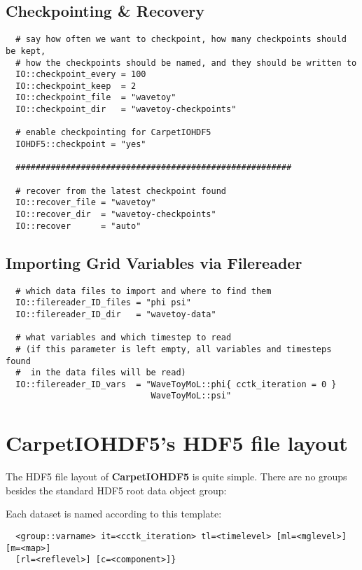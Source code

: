 \documentclass{article}
\begin{document}
\subsection{Checkpointing \& Recovery}

\begin{verbatim}
  # say how often we want to checkpoint, how many checkpoints should be kept,
  # how the checkpoints should be named, and they should be written to
  IO::checkpoint_every = 100
  IO::checkpoint_keep  = 2
  IO::checkpoint_file  = "wavetoy"
  IO::checkpoint_dir   = "wavetoy-checkpoints"

  # enable checkpointing for CarpetIOHDF5
  IOHDF5::checkpoint = "yes"

  #######################################################

  # recover from the latest checkpoint found
  IO::recover_file = "wavetoy"
  IO::recover_dir  = "wavetoy-checkpoints"
  IO::recover      = "auto"
\end{verbatim}

\subsection{Importing Grid Variables via Filereader}

\begin{verbatim}
  # which data files to import and where to find them
  IO::filereader_ID_files = "phi psi"
  IO::filereader_ID_dir   = "wavetoy-data"

  # what variables and which timestep to read
  # (if this parameter is left empty, all variables and timesteps found
  #  in the data files will be read)
  IO::filereader_ID_vars  = "WaveToyMoL::phi{ cctk_iteration = 0 }
                             WaveToyMoL::psi"
\end{verbatim}


\iffalse
\section{CarpetIOHDF5's HDF5 file layout}

The HDF5 file layout of {\bf CarpetIOHDF5} is quite simple.
There are no groups besides the standard HDF5 root data object group:

Each dataset is named according to this template:

\begin{verbatim}
  <group::varname> it=<cctk_iteration> tl=<timelevel> [ml=<mglevel>] [m=<map>]
  [rl=<reflevel>] [c=<component>]}
\end{verbatim}
\end{document}
